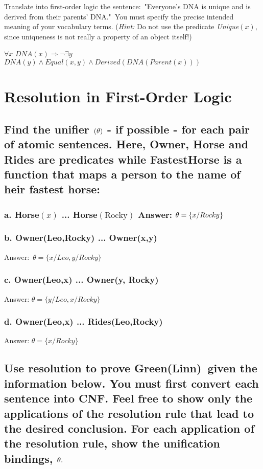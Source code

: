 \documentclass{article}
\begin{document}
Translate into first-order logic the sentence:\ "Everyone's DNA is unique
and is derived from their parents' DNA."\ You must specify the precise
intended meaning of your vocabulary terms. (\textit{Hint:} Do not use the
predicate \textit{Unique}$\left( x\right) $, since uniqueness is not really
a property of an object itself!)

$\forall x$ $DNA\left( x\right) \Longrightarrow \lnot \exists y$ $DNA\left(
y\right) \wedge Equal\left( x,y\right) \wedge Derived\left( DNA\left(
Parent\left( x\right) \right) \right) $

\section{Resolution in First-Order Logic}

\subsection{Find the unifier $\left( \protect\theta \right) $ - if possible
- for each pair of atomic sentences. Here, Owner, Horse and Rides are
predicates while FastestHorse is a function that maps a person to the name
of heir fastest horse:}

\subsubsection{a. Horse$\left( x\right) $ ... Horse$\left( \text{Rocky}%
\right) $ Answer: $\protect\theta =\{x/Rocky\}$}

\subsubsection{b. Owner(Leo,Rocky) ... Owner(x,y)}

Answer:\ $\theta =\{x/Leo,y/Rocky\}$

\subsubsection{c. Owner(Leo,x) ... Owner(y, Rocky)}

Answer: $\theta =\{y/Leo,x/Rocky\}$

\subsubsection{d. Owner(Leo,x) ... Rides(Leo,Rocky)}

Answer: $\theta =\{x/Rocky\}$

\subsection{Use resolution to prove Green(Linn)\ given the information
below. You must first convert each sentence into CNF. Feel free to show only
the applications of the resolution rule that lead to the desired conclusion.
For each application of the resolution rule, show the unification bindings, $%
\protect\theta .$}
\end{document}
